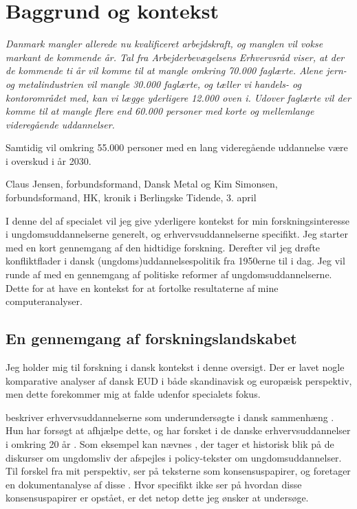 \section{Baggrund og kontekst}\label{sec:baggrund}
\epigraph{\itshape
Danmark mangler allerede nu kvalificeret arbejdskraft, og manglen vil vokse markant de kommende år. Tal fra Arbejderbevægelsens Erhvervsråd viser, at der de kommende ti år vil komme til at mangle omkring 70.000 faglærte. Alene jern- og metalindustrien vil mangle 30.000 faglærte, og tæller vi handels- og kontorområdet med, kan vi lægge yderligere 12.000 oven i. Udover faglærte vil der komme til at mangle flere end 60.000 personer med korte og mellemlange videregående uddannelser.

Samtidig vil omkring 55.000 personer med en lang videregående uddannelse være i overskud i år 2030.
}
{Claus Jensen, forbundsformand, Dansk Metal og Kim Simonsen, forbundsformand, HK, kronik i Berlingske Tidende, 3. april \citeyear{simonsenLadOsGore2016}}


I denne del af specialet vil jeg give yderligere kontekst for min forskningsinteresse i ungdomsuddannelserne generelt, og erhvervsuddannelserne specifikt.
Jeg starter med en kort gennemgang af den hidtidige forskning.
Derefter vil jeg drøfte konfliktflader i dansk (ungdoms)uddannelsespolitik fra 1950erne til i dag.
Jeg vil runde af med en gennemgang af politiske reformer af ungdomsuddannelserne.
Dette for at have en kontekst for at fortolke resultaterne af mine computeranalyser.

\subsection{En gennemgang af forskningslandskabet}\label{sec:litreview}
Jeg holder mig til forskning i dansk kontekst i denne oversigt.
Der er lavet nogle komparative analyser af dansk EUD i både skandinavisk og europæisk perspektiv, men dette forekommer mig at falde udenfor specialets fokus.

\citeauthor{juulErhvervsuddannelserneForsomtForskningsomrade2004} beskriver erhvervsuddannelserne som underundersøgte i dansk sammenhæng \autocite{juulErhvervsuddannelserneForsomtForskningsomrade2004}.
Hun har forsøgt at afhjælpe dette, og har forsket i de danske erhvervsuddannelser i omkring 20 år \autocite{IdaJuulPublikationer}.
Som eksempel kan nævnes , der tager et historisk blik på de diskurser om ungdomsliv der afspejles i policy-tekster om ungdomsuddannelser.
Til forskel fra mit perspektiv, ser \citeauthor{juulDiskurserOmUngdom2013} på teksterne som konsensuspapirer, og foretager en dokumentanalyse af disse \autocite{juulDiskurserOmUngdom2013}.
Hvor \citeauthor{juulDiskurserOmUngdom2013} specifikt ikke ser på hvordan disse konsensuspapirer er opstået, er det netop dette jeg ønsker at undersøge.


